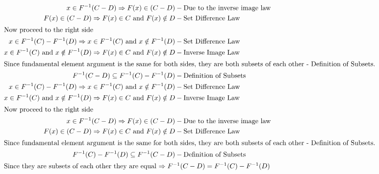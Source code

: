\documentclass[11pt]{article}
\begin{document}
\begin{flushleft}
\begin{align*}
x\in F^{-1}(C-D)\Rightarrow F(x)\in (C-D) &- \text{Due to the inverse image law} \\
F(x)\in (C-D)\Rightarrow F(x)\in C\text{ and }F(x)\notin D &- \text{Set Difference Law} \\
\intertext{Now proceed to the right side}
x\in F^{-1}(C) - F^{-1}(D) \Rightarrow x\in F^{-1}(C)\text{ and }x\notin F^{-1}(D)  &- \text{Set Difference Law}\\
x\in F^{-1}(C)\text{ and }x\notin F^{-1}(D) \Rightarrow F(x)\in C \text{ and }F(x)\notin D &- \text{Inverse Image Law}\\
\intertext{Since fundamental element argument is the same for both sides, they are both subsets of each other - Definition of Subsets.}
F^{-1}(C-D)\subseteq F^{-1}(C) - F^{-1}(D) &- \text{Definition of Subsets}\\
x\in F^{-1}(C) - F^{-1}(D) \Rightarrow x\in F^{-1}(C)\text{ and }x\notin F^{-1}(D)  &- \text{Set Difference Law}\\
x\in F^{-1}(C)\text{ and }x\notin F^{-1}(D) \Rightarrow F(x)\in C \text{ and }F(x)\notin D &- \text{Inverse Image Law}\\
\intertext{Now proceed to the right side}
x\in F^{-1}(C-D)\Rightarrow F(x)\in (C-D) &- \text{Due to the inverse image law} \\
F(x)\in (C-D)\Rightarrow F(x)\in C\text{ and }F(x)\notin D &- \text{Set Difference Law} \\
\intertext{Since fundamental element argument is the same for both sides, they are both subsets of each other - Definition of Subsets.}
F^{-1}(C) - F^{-1}(D)\subseteq F^{-1}(C-D) &- \text{Definition of Subsets}\\
\intertext{Since they are subsets of each other they are equal $\Rightarrow F^{-1}(C-D)= F^{-1}(C) - F^{-1}(D)$}
\end{align*}

\vspace{-14mm}

\hrulefill 

\end{flushleft}
\end{document}
